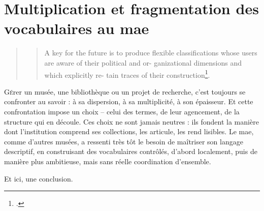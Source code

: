 \chapter[Les vocabulaires contrôlés au \ac{mae}]{\label{II-A} Multiplication et fragmentation des vocabulaires au \ac{mae}}

\begin{quote}
	\blockquote{A key for the
		future is to produce flexible classifications
		whose users are aware of their political and or-
		ganizational dimensions and which explicitly re-
		tain traces of their construction\footcite{bowkerArrangerChosesConsequences2023}.}
\end{quote}

\lettrine{G}érer un musée, une bibliothèque ou un projet de recherche, c’est toujours se confronter au savoir : à sa dispersion, à sa multiplicité, à son épaisseur. Et cette confrontation impose un choix – celui des termes, de leur agencement, de la structure qui en découle. Ces choix ne sont jamais neutres : ils fondent la manière dont l’institution comprend ses collections, les articule, les rend lisibles. Le \ac{mae}, comme d’autres musées, a ressenti très tôt le besoin de maîtriser son langage descriptif, en construisant des vocabulaires contrôlés, d’abord localement, puis de manière plus ambitieuse, mais sans réelle coordination d’ensemble.






\bigskip
\bigskip
\bigskip

Et ici, une conclusion.